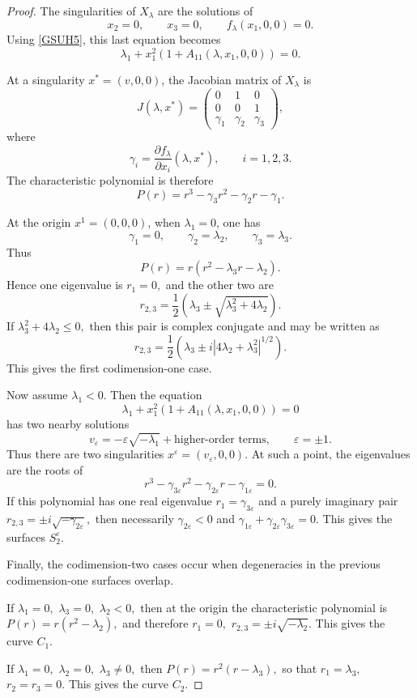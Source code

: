 \documentclass[10pt,a4paper]{amsart}
\begin{document}
\begin{proof}
	The singularities of $X_\lambda$ are the solutions of
	$$
	x_2=0,
	\qquad
	x_3=0,
	\qquad
	f_\lambda(x_1,0,0)=0.
	$$
	Using \eqref{GSUH5}, this last equation becomes
	$$
	\lambda_1
	+
	x_1^2
	\left(
	1+A_{11}(\lambda,x_1,0,0)
	\right)
	=0.
	$$
	
	At a singularity $x^\ast=(v,0,0)$, the Jacobian matrix of $X_\lambda$ is
	$$
	J(\lambda,x^\ast)
	=
	\begin{pmatrix}
		0 & 1 & 0\\
		0 & 0 & 1\\
		\gamma_1 & \gamma_2 & \gamma_3
	\end{pmatrix},
	$$
	where
	$$
	\gamma_i
	=
	\frac{\partial f_\lambda}{\partial x_i}
	(\lambda,x^\ast),
	\qquad
	i=1,2,3.
	$$
	The characteristic polynomial is therefore
	$$
	P(r)
	=
	r^3-\gamma_3r^2-\gamma_2r-\gamma_1.
	$$
	
	At the origin $x^1=(0,0,0)$, when $\lambda_1=0$, one has
	$$
	\gamma_1=0,
	\qquad
	\gamma_2=\lambda_2,
	\qquad
	\gamma_3=\lambda_3.
	$$
	Thus
	$$
	P(r)
	=
	r(r^2-\lambda_3r-\lambda_2).
	$$
	Hence one eigenvalue is $r_1=0,$
	and the other two are
	$$
	r_{2,3}
	=
	\frac{1}{2}
	\left(
	\lambda_3
	\pm
	\sqrt{\lambda_3^2+4\lambda_2}
	\right).
	$$
	If $\lambda_3^2+4\lambda_2\leq 0,$
	then this pair is complex conjugate and may be written as
	$$
	r_{2,3}
	=
	\frac{1}{2}
	\left(
	\lambda_3
	\pm
	i\left|4\lambda_2+\lambda_3^2\right|^{1/2}
	\right).
	$$
	This gives the first codimension-one case.
	
	Now assume $\lambda_1<0$. Then the equation
	$$
	\lambda_1
	+
	x_1^2
	\left(
	1+A_{11}(\lambda,x_1,0,0)
	\right)
	=0
	$$
	has two nearby solutions
	$$
	v_\varepsilon
	=
	-\varepsilon\sqrt{-\lambda_1}
	+
	\text{higher-order terms},
	\qquad
	\varepsilon=\pm 1.
	$$
	Thus there are two singularities $x^\varepsilon=(v_\varepsilon,0,0).$
	At such a point, the eigenvalues are the roots of
	$$
	r^3-\gamma_{3\varepsilon}r^2
	-\gamma_{2\varepsilon}r
	-\gamma_{1\varepsilon}
	=0.
	$$
	If this polynomial has one real eigenvalue $r_1=\gamma_{3\varepsilon}$
	and a purely imaginary pair $r_{2,3}=\pm i\sqrt{-\gamma_{2\varepsilon}},$
	then necessarily $\gamma_{2\varepsilon}<0$
	and $\gamma_{1\varepsilon}+\gamma_{2\varepsilon}\gamma_{3\varepsilon}=0.$
	This gives the surfaces $S_2^\varepsilon$.
	
	Finally, the codimension-two cases occur when degeneracies in the previous
	codimension-one surfaces overlap.
	
	If $\lambda_1=0,$ $\lambda_3=0,$ $\lambda_2<0,$
	then at the origin the characteristic polynomial is $
	P(r)=r(r^2-\lambda_2),$
	and therefore $r_1=0,$ $r_{2,3}=\pm i\sqrt{-\lambda_2}.$
	This gives the curve $C_1$.
	
	If $\lambda_1=0,$ $\lambda_2=0,$ $\lambda_3\neq 0,$
	then $P(r)=r^2(r-\lambda_3),$
	so that $r_1=\lambda_3,$ $r_2=r_3=0.$
	This gives the curve $C_2$.
\end{proof}
\end{document}
